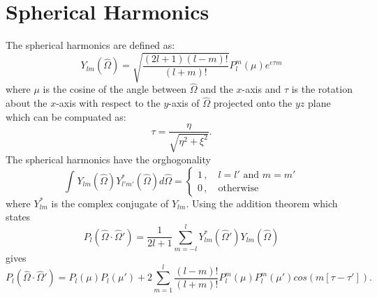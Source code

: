 \section{Spherical Harmonics}\label{appdx:spherical}

The spherical harmonics are defined as:
\begin{equation}
Y_{lm}(\hat{\Omega}) = \sqrt{\frac{(2l+1)(l-m)!}{(l+m)!}}P_l^m(\mu)e^{e \tau m}
\end{equation}
where $\mu$ is the cosine of the angle between $\hat{\Omega}$ and the $x$-axis and $\tau$ is the rotation about the $x$-axis with respect to the $y$-axis of $\hat{\Omega}$ projected onto the $yz$ plane which can be compuated as:
\begin{equation}
\tau = \frac{\eta}{\sqrt{\eta^2 + \xi^2}}.
\end{equation}
The spherical harmonics have the orghogonality
\begin{equation}
\int_{}^{}Y_{lm}(\hat{\Omega})Y_{l'm'}^*(\hat{\Omega}) d\hat{\Omega}= 
\begin{cases}
1 \,, \quad l = l' \text{ and } m = m' \\
0 \,, \quad \text{otherwise}
\end{cases}
\end{equation}
where $Y_{lm}^*$ is the complex conjugate of $Y_{lm}$. Using the addition theorem which states
\begin{equation}
P_l(\hat{\Omega} \cdot \hat{\Omega}') = \frac{1}{2l+1}\sum_{m=-l}^{l}Y_{lm}^*(\hat{\Omega}') Y_{lm}(\hat{\Omega})
\end{equation}
gives
\begin{equation}
P_l(\hat{\Omega} \cdot \hat{\Omega}') = P_l(\mu)P_l(\mu') + 2\sum_{m=1}^{l}\frac{(l-m)!}{(l+m)!}P_l^m(\mu) P_l^m(\mu') cos(m[\tau - \tau']).
\end{equation}

\endinput

